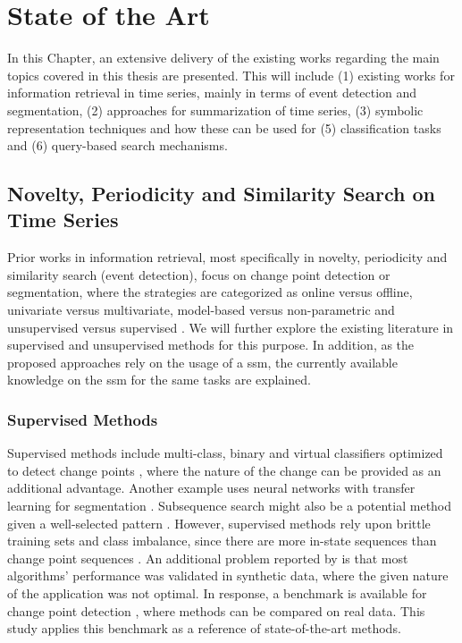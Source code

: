 
%

\chapter{State of the Art}
\label{cha:stateofart}

In this Chapter, an extensive delivery of the existing works regarding the main topics covered in this thesis are presented. This will include (1) existing works for information retrieval in time series, mainly in terms of event detection and segmentation, (2) approaches for summarization of time series, (3) symbolic representation techniques and how these can be used for (5) classification tasks and (6) query-based search mechanisms.

\section{Novelty, Periodicity and Similarity Search on Time Series} %
\label{sec:if_timeseries}


Prior works in information retrieval, most specifically in novelty, periodicity and similarity search (event detection), focus on change point detection or segmentation, where the strategies are categorized as online versus offline, univariate versus multivariate, model-based versus non-parametric and unsupervised versus supervised \cite{cpd_alan, review_1, review_2}. We will further explore the existing literature in supervised and unsupervised methods for this purpose. In addition, as the proposed approaches rely on the usage of a \gls{ssm}, the currently available knowledge on the \gls{ssm} for the same tasks are explained.

\subsection{Supervised Methods}

Supervised methods include multi-class, binary and virtual classifiers optimized to detect change points \cite{review_1}, where the nature of the change can be provided as an additional advantage. Another example uses neural networks with transfer learning for segmentation \cite{pedromatias}. Subsequence search might also be a potential method given a well-selected pattern \cite{folgado2022tssearch}. However, supervised methods rely upon brittle training sets and class imbalance, since there are more in-state sequences than change point sequences \cite{review_1}. An additional problem reported by \cite{cpd_alan} is that most algorithms' performance was validated in synthetic data, where the given nature of the application was not optimal. In response, a benchmark is available for change point detection \cite{cpd_alan}, where methods can be compared on real data. This study applies this benchmark as a reference of state-of-the-art methods.


